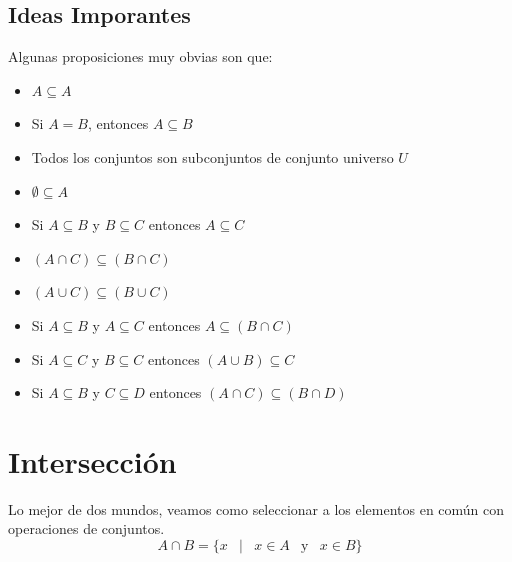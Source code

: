 \documentclass[12pt, fleqn]{report}                             %
\DeclareMathOperator \Space     {\quad}                         %
\DeclareMathOperator \MiniSpace {\;}                            %
\newcommand \Such           {\MiniSpace | \MiniSpace}           %
\newcommand \Also           {\MiniSpace \text{y} \MiniSpace}    %
\theoremstyle{break}                                            %
\begin{document}
            \subsection{Ideas Imporantes}

                Algunas proposiciones muy obvias son que:
                \begin{itemize}
                    \item $A \subseteq A$
                    \item Si $A = B$, entonces $A \subseteq B$
                    \item Todos los conjuntos son subconjuntos de conjunto universo $U$
                    \item $\emptyset \subseteq A$
                    \item Si $A \subseteq B$ y $B \subseteq C$ entonces $A \subseteq C$
                    \item $(A \cap C) \subseteq (B \cap C)$
                    \item $(A \cup C) \subseteq (B \cup C)$
                    \item Si $A \subseteq B$ y $A \subseteq C$ entonces $A \subseteq (B \cap C)$
                    \item Si $A \subseteq C$ y $B \subseteq C$ entonces $(A \cup B) \subseteq C$
                    \item Si $A \subseteq B$ y $C \subseteq D$ entonces $(A \cap C) \subseteq (B \cap D)$
                \end{itemize}









        \clearpage
        \section{Intersección}

            Lo mejor de dos mundos, veamos como seleccionar a los elementos en común con operaciones
            de conjuntos.
            \begin{equation*}
                A \cap B = \{ x \Such x \in A \Also x \in B \}
            \end{equation*}
\end{document}
